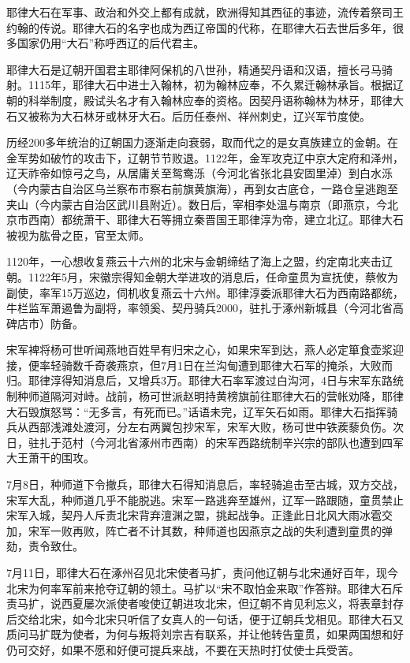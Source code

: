 耶律大石在军事、政治和外交上都有成就，欧洲得知其西征的事迹，流传着祭司王约翰的传说。耶律大石的名字也成为西辽帝国的代称，在耶律大石去世后多年，很多国家仍用“大石”称呼西辽的后代君主。

耶律大石是辽朝开国君主耶律阿保机的八世孙，精通契丹语和汉语，擅长弓马骑射。1115年，耶律大石中进士入翰林，初为翰林应奉，不久累迁翰林承旨。根据辽朝的科举制度，殿试头名才有入翰林应奉的资格。因契丹语称翰林为林牙，耶律大石又被称为大石林牙或林牙大石。后历任泰州、祥州刺史，辽兴军节度使。

历经200多年统治的辽朝国力逐渐走向衰弱，取而代之的是女真族建立的金朝。在金军势如破竹的攻击下，辽朝节节败退。1122年，金军攻克辽中京大定府和泽州，辽天祚帝如惊弓之鸟，从居庸关至鸳鸯泺（今河北省张北县安固里淖）到白水泺（今内蒙古自治区乌兰察布市察右前旗黄旗海），再到女古底仓，一路仓皇逃跑至夹山（今内蒙古自治区武川县附近）。数日后，宰相李处温与南京（即燕京，今北京市西南）都统萧干、耶律大石等拥立秦晋国王耶律淳为帝，建立北辽。耶律大石被视为肱骨之臣，官至太师。

1120年，一心想收复燕云十六州的北宋与金朝缔结了海上之盟，约定南北夹击辽朝。1122年5月，宋徽宗得知金朝大举进攻的消息后，任命童贯为宣抚使，蔡攸为副使，率军15万巡边，伺机收复燕云十六州。耶律淳委派耶律大石为西南路都统，牛栏监军萧遏鲁为副将，率领奚、契丹骑兵2000，驻扎于涿州新城县（今河北省高碑店市）防备。

宋军裨将杨可世听闻燕地百姓早有归宋之心，如果宋军到达，燕人必定箪食壶浆迎接，便率轻骑数千奇袭燕京，但7月1日在兰沟甸遭到耶律大石军的掩杀，大败而归。耶律淳得知消息后，又增兵3万。耶律大石率军渡过白沟河，4日与宋军东路统制种师道隔河对峙。战前，杨可世派赵明持黄榜旗前往耶律大石的营帐劝降，耶律大石毁旗怒骂：“无多言，有死而已。”话语未完，辽军矢石如雨。耶律大石指挥骑兵从西部浅滩处渡河，分左右两翼包抄宋军，宋军大败，杨可世中铁蒺藜负伤。次日，驻扎于范村（今河北省涿州市西南）的宋军西路统制辛兴宗的部队也遭到四军大王萧干的围攻。

7月8日，种师道下令撤兵，耶律大石得知消息后，率轻骑追击至古城，双方交战，宋军大乱，种师道几乎不能脱逃。宋军一路逃奔至雄州，辽军一路跟随，童贯禁止宋军入城，契丹人斥责北宋背弃澶渊之盟，挑起战争。正逢此日北风大雨冰雹交加，宋军一败再败，阵亡者不计其数，种师道也因燕京之战的失利遭到童贯的弹劾，责令致仕。

7月11日，耶律大石在涿州召见北宋使者马扩，责问他辽朝与北宋通好百年，现今北宋为何率军前来抢夺辽朝的领土。马扩以“宋不取怕金来取”作答辩。耶律大石斥责马扩，说西夏屡次派使者唆使辽朝进攻北宋，但辽朝不肯见利忘义，将表章封存后交给北宋，如今北宋只听信了女真人的一句话，便于辽朝兵戈相见。耶律大石又质问马扩既为使者，为何与叛将刘宗吉有联系，并让他转告童贯，如果两国想和好仍可交好，如果不愿和好便可提兵来战，不要在天热时打仗使士兵受苦。


